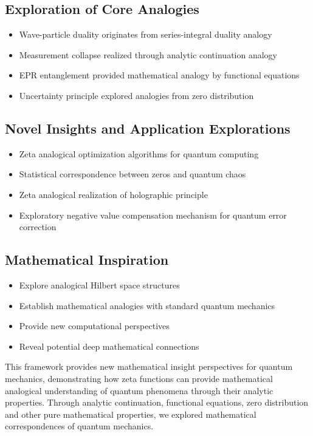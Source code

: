 \documentclass[11pt]{article}
\theoremstyle{plain}
\theoremstyle{definition}
\theoremstyle{remark}
\begin{document}
\subsection{Exploration of Core Analogies}
\begin{itemize}
\item Wave-particle duality originates from series-integral duality analogy
\item Measurement collapse realized through analytic continuation analogy
\item EPR entanglement provided mathematical analogy by functional equations
\item Uncertainty principle explored analogies from zero distribution
\end{itemize}

\subsection{Novel Insights and Application Explorations}
\begin{itemize}
\item Zeta analogical optimization algorithms for quantum computing
\item Statistical correspondence between zeros and quantum chaos
\item Zeta analogical realization of holographic principle
\item Exploratory negative value compensation mechanism for quantum error correction
\end{itemize}

\subsection{Mathematical Inspiration}
\begin{itemize}
\item Explore analogical Hilbert space structures
\item Establish mathematical analogies with standard quantum mechanics
\item Provide new computational perspectives
\item Reveal potential deep mathematical connections
\end{itemize}

This framework provides new mathematical insight perspectives for quantum mechanics, demonstrating how zeta functions can provide mathematical analogical understanding of quantum phenomena through their analytic properties. Through analytic continuation, functional equations, zero distribution and other pure mathematical properties, we explored mathematical correspondences of quantum mechanics.
\end{document}
